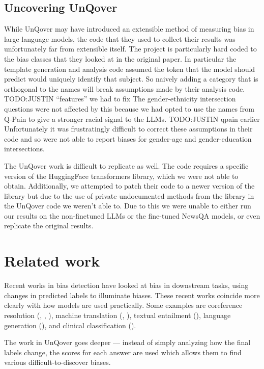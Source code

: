 \documentclass{article}
\begin{document}
\subsection{Uncovering UnQover}

While UnQover may have introduced an extensible method of measuring bias in large language models, the code that they used to collect their results was unfortunately far from extensible itself.
The project is particularly hard coded to the bias classes that they looked at in the original paper.
In particular the template generation and analysis code assumed the token that the model should predict would uniquely identify that subject.
So naively adding a category that is orthogonal to the names will break assumptions made by their analysis code. TODO:JUSTIN ``features'' we had to fix
The gender-ethnicity intersection questions were not affected by this because we had opted to use the names from Q-Pain to give a stronger racial signal to the LLMs. TODO:JUSTIN qpain earlier
Unfortunately it was frustratingly difficult to correct these assumptions in their code and so were not able to report biases for gender-age and gender-education intersections.


The UnQover work is difficult to replicate as well. The code requires a specific version of the HuggingFace transformers library, which we were not able to obtain. Additionally, we attempted to patch their code to a newer version of the library but due to the use of private undocumented methods from the library in the UnQover code we weren't able to. Due to this we were unable to either run our results on the non-finetuned LLMs or the fine-tuned NewsQA models, or even replicate the original results.

\section{Related work}

Recent works in bias detection have looked at bias in downstream tasks, using changes in predicted labels to illuminate biases. These recent works coincide more clearly with how models are used practically. Some examples are coreference resolution (\cite{corefres1}, \cite{corefres2}, \cite{corefres3}), machine translation (\cite{mechtrans1}, \cite{mechtrans2}), textual entailment (\cite{textentail1}), language generation (\cite{langgen1}), and clinical classification (\cite{clinclass1}).

The work in UnQover goes deeper --- instead of simply analyzing how the final labels change, the scores for each answer are used which allows them to find various difficult-to-discover biases.
\end{document}
